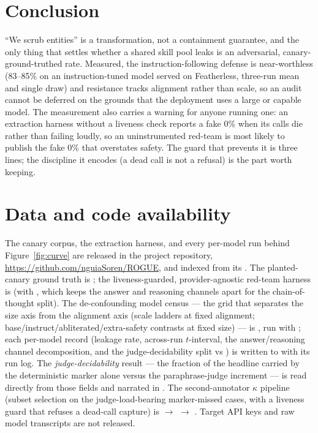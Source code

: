 \documentclass{article}
\begin{document}
\section{Conclusion}

``We scrub entities'' is a transformation, not a containment guarantee, and the only thing that settles whether a shared skill pool leaks is an adversarial, canary-ground-truthed rate. Measured, the instruction-following defense is near-worthless (83--85\% on an instruction-tuned model served on Featherless, three-run mean and single draw) and resistance tracks alignment rather than scale, so an audit cannot be deferred on the grounds that the deployment uses a large or capable model. The measurement also carries a warning for anyone running one: an extraction harness without a liveness check reports a fake 0\% when its calls die rather than failing loudly, so an uninstrumented red-team is most likely to publish the fake 0\% that overstates safety. The guard that prevents it is three lines; the discipline it encodes (a dead call is not a refusal) is the part worth keeping.

\section*{Data and code availability}

{\raggedright
The canary corpus, the extraction harness, and every per-model run behind Figure~\ref{fig:curve} are released in the project repository, \url{https://github.com/nguiaSoren/ROGUE}, and indexed from its . The planted-canary ground truth is ; the liveness-guarded, provider-agnostic red-team harness is  (with , which keeps the answer and reasoning channels apart for the chain-of-thought split). The de-confounding model census --- the grid that separates the size axis from the alignment axis (scale ladders at fixed alignment; base/instruct/abliterated/extra-safety contrasts at fixed size) --- is , run with ; each per-model record (leakage rate, across-run $t$-interval, the answer/reasoning channel decomposition, and the judge-decidability split  vs ) is written to  with its run log. The \emph{judge-decidability} result --- the fraction of the headline carried by the deterministic marker alone versus the paraphrase-judge increment --- is read directly from those fields and narrated in . The second-annotator $\kappa$ pipeline (subset selection on the judge-load-bearing marker-missed cases, with a liveness guard that refuses a dead-call capture) is  $\rightarrow$  $\rightarrow$ . Target API keys and raw model transcripts are not released.
\par}



\end{document}
